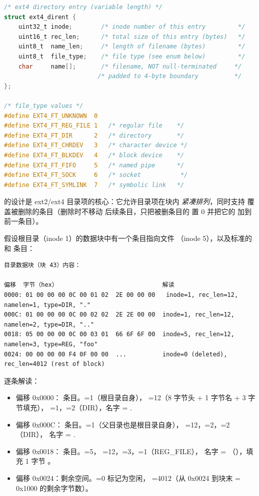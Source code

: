 \begin{filesystemlayout}
\begin{lstlisting}[language=C]
/* ext4 directory entry (variable length) */
struct ext4_dirent {
    uint32_t inode;        /* inode number of this entry         */
    uint16_t rec_len;      /* total size of this entry (bytes)   */
    uint8_t  name_len;     /* length of filename (bytes)         */
    uint8_t  file_type;    /* file type (see enum below)         */
    char     name[];       /* filename, NOT null-terminated     */
                          /* padded to 4-byte boundary          */
};

/* file_type values */
#define EXT4_FT_UNKNOWN  0
#define EXT4_FT_REG_FILE 1   /* regular file    */
#define EXT4_FT_DIR      2   /* directory       */
#define EXT4_FT_CHRDEV   3   /* character device */
#define EXT4_FT_BLKDEV   4   /* block device    */
#define EXT4_FT_FIFO     5   /* named pipe      */
#define EXT4_FT_SOCK     6   /* socket           */
#define EXT4_FT_SYMLINK  7   /* symbolic link   */
\end{lstlisting}

 的设计是 ext2/ext4 目录项的核心：它允许目录项在块内
\emph{紧凑排列}，同时支持 覆盖被删除的条目（删除时不移动
后续条目，只把被删条目的  置 0 并把它的  加到
前一条目）。


假设根目录（inode 1）的数据块中有一个条目指向文件 
（inode 5），以及标准的  和  条目：

\begin{lstlisting}
目录数据块（块 43）内容：

偏移  字节（hex）                             解读
0000: 01 00 00 00 0C 00 01 02  2E 00 00 00   inode=1, rec_len=12, namelen=1, type=DIR, "."
000C: 01 00 00 00 0C 00 02 02  2E 2E 00 00  inode=1, rec_len=12, namelen=2, type=DIR, ".."
0018: 05 00 00 00 0C 00 03 01  66 6F 6F 00  inode=5, rec_len=12, namelen=3, type=REG, "foo"
0024: 00 00 00 00 F4 0F 00 00  ...          inode=0 (deleted), rec_len=4012 (rest of block)
\end{lstlisting}

逐条解读：

\begin{itemize}\tightlist
\item 偏移 0x0000： 条目。=1（根目录自身），
  =12（8 字节头 + 1 字节名 + 3 字节填充），
  =1，=2（DIR），名字 = .
\item 偏移 0x000C： 条目。=1（父目录也是根目录自身），
  =12，=2，=2（DIR），
  名字 = .
\item 偏移 0x0018： 条目。=5，
  =12，=3，=1（REG\_FILE），
  名字 = （），填充 1 字节 。
\item 偏移 0x0024：剩余空间。=0 标记为空闲，
  =4012（从 0x0024 到块末 = 0x1000 的剩余字节数）。
\end{itemize}


\end{filesystemlayout}
